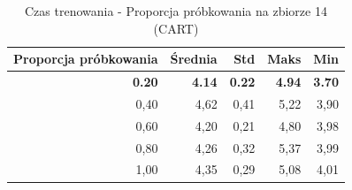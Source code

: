 \begin{table}[htbp]
\centering
\small
\setlength{\tabcolsep}{6pt}
\renewcommand{\arraystretch}{1.2}
\caption{Czas trenowania - Proporcja próbkowania na zbiorze 14 (CART)}
\label{tab:CART_sample_ratio_14_time}
\begin{tabular}{r|r|r|r|r}
\toprule
Proporcja próbkowania & Średnia & Std & Maks & Min \\
\hline
\textbf{0.20} & \textbf{4.14} & \textbf{0.22} & \textbf{4.94} & \textbf{3.70} \\
0,40 & 4,62 & 0,41 & 5,22 & 3,90 \\
0,60 & 4,20 & 0,21 & 4,80 & 3,98 \\
0,80 & 4,26 & 0,32 & 5,37 & 3,99 \\
1,00 & 4,35 & 0,29 & 5,08 & 4,01 \\
\bottomrule
\end{tabular}
\end{table}